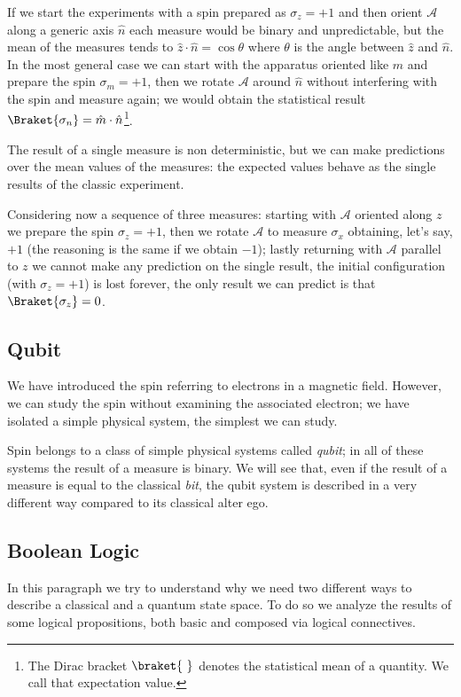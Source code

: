 If we start the experiments with a spin prepared as $\sigma_z = +1$ and then orient $\mathcal{A}$ along a generic axis $\hat{n}$ each measure would be binary and unpredictable, but the mean of the measures tends to $\hat{z}\cdot\hat{n}=\cos\theta$ where $\theta$ is the angle between $\hat{z}$ and $\hat{n}$. In the most general case we can start with the apparatus oriented like $m$ and prepare the spin $\sigma_m = +1$, then we rotate $\mathcal{A}$ around $\hat{n}$ without interfering with the spin and measure again; we would obtain the statistical result $\Braket{\sigma_n} = \hat{m}\cdot\hat{n}$\footnote{The Dirac bracket $\braket{\ }$ denotes the statistical mean of a quantity. We call that expectation value.}.

The result of a single measure is non deterministic, but we can make predictions over the mean values of the measures: the expected values behave as the single results of the classic experiment.

Considering now a sequence of three measures: starting with $\mathcal{A}$ oriented along $z$ we prepare the spin $\sigma_z=+1$, then we rotate $\mathcal{A}$ to measure $\sigma_x$ obtaining, let's say, $+1$ (the reasoning is the same if we obtain $-1$); lastly returning with $\mathcal{A}$ parallel to $z$ we cannot make any prediction on the single result, the initial configuration (with $\sigma_z=+1$) is lost forever, the only result we can predict is that $\Braket{\sigma_z} = 0$.

\subsection{Qubit}
We have introduced the spin referring to electrons in a magnetic field. However, we can study the spin without examining the associated electron; we have isolated a simple physical system, the simplest we can study.

Spin belongs to a class of simple physical systems called \emph{qubit}; in all of these systems the result of a measure is binary. We will see that, even if the result of a measure is equal to the classical \emph{bit}, the qubit system is described in a very different way compared to its classical alter ego.

\subsection{Boolean Logic}
In this paragraph we try to understand why we need two different ways to describe a classical and a quantum state space. To do so we analyze the results of some logical propositions, both basic and composed via logical connectives.

